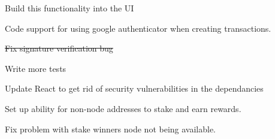 \begin{DoxyItemize}
\begin{DoxyItemize}
\item Build this functionality into the UI
\end{DoxyItemize}
\item Code support for using google authenticator when creating transactions.
\item \sout{Fix signature verification bug}
\item Write more tests
\item Update React to get rid of security vulnerabilities in the dependancies
\item Set up ability for non-\/node addresses to stake and earn rewards.
\begin{DoxyItemize}
\item Fix problem with stake winner\textquotesingle{}s node not being available. 
\end{DoxyItemize}
\end{DoxyItemize}